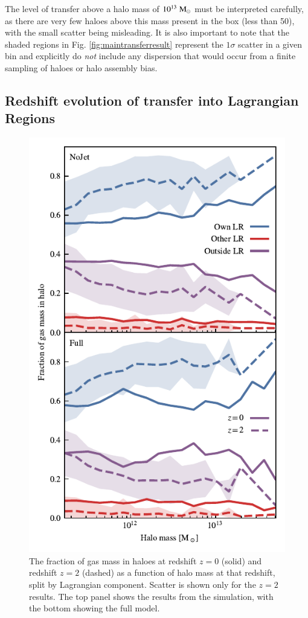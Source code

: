 The level of transfer above a halo mass of $10^{13} \;{\rm M}_{\odot}{}$ must be
interpreted carefully, as there are very few haloes above this mass present
in the box (less than 50), with the small scatter being misleading. It is
also important to note that the shaded regions in Fig.
\ref{fig:maintransferresult} represent the $1\sigma$ scatter in a given bin
and explicitly do \emph{not} include any dispersion that would occur from a
finite sampling of haloes or halo assembly bias.

\subsection{Redshift evolution of transfer into Lagrangian Regions}

\begin{figure}
    \centering
    \includegraphics[width=\columnwidth]{figures/component_fraction_multi_z.pdf}
    \vspace{-0.7cm}
    \caption{The fraction of gas mass in haloes at redshift $z=0$ (solid) and
    redshift $z=2$ (dashed) as a function of halo mass at that redshift, split by
    Lagrangian component. Scatter is shown only for the $z=2$ results. The top panel
    shows the results from the \nojet{} simulation, with the bottom showing the
    full \simba{} model.}
    \label{fig:ltzevo}
\end{figure}

